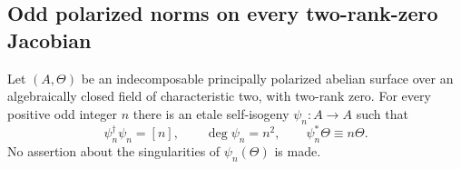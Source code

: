 \subsection{Odd polarized norms on every two-rank-zero Jacobian}

\begin{lemma}
\label{lem:root-f0-all-odd-polarized-norms-candidate}
Let $(A,\Theta)$ be an indecomposable principally polarized abelian
surface over an algebraically closed field of characteristic two,
with two-rank zero. For every positive odd integer $n$ there is
an etale self-isogeny $\psi_n:A\to A$ such that
\[
 \psi_n^\dagger\psi_n=[n],\qquad
 \deg\psi_n=n^2,\qquad \psi_n^*\Theta\equiv n\Theta.
\]
No assertion about the singularities of $\psi_n(\Theta)$ is made.
\end{lemma}
